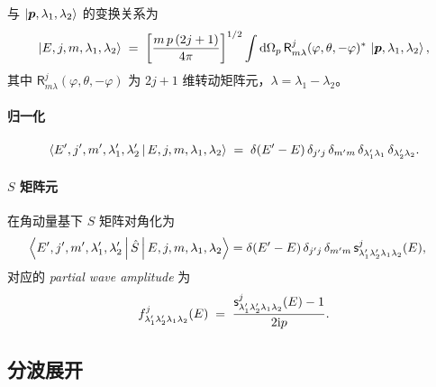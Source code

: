 与 $\ket{\bm p,\lambda_1,\lambda_2}$ 的变换关系为
\begin{equation}
  \ket{E,j,m,\lambda_1,\lambda_2}
  \;=\; \left[\frac{m\,p\,(2j+1)}{4\pi}\right]^{1/2}
        \int \mathrm{d}\Omega_p\, \mathsf{R}^{j}_{m\lambda}(\varphi,\theta,-\varphi)^*\,\ket{\bm p,\lambda_1,\lambda_2},
  \label{eq:Ejm-from-p}
\end{equation}
其中 $\mathsf{R}^{j}_{m\lambda}(\varphi,\theta,-\varphi)$ 为 $2j+1$ 维转动矩阵元，$\lambda=\lambda_1-\lambda_2$。

\paragraph{归一化}
\begin{equation}
  \left\langle E',j',m',\lambda'_1,\lambda'_2 \,\middle|\, E,j,m,\lambda_1,\lambda_2 \right\rangle
  \;=\; \delta(E'-E)\,\delta_{j'j}\,\delta_{m'm}\,\delta_{\lambda'_1\lambda_1}\,\delta_{\lambda'_2\lambda_2}.
  \label{eq:Ejm-norm}
\end{equation}

\paragraph{$S$ 矩阵元} 在角动量基下 $S$ 矩阵对角化为
\begin{align}
  \left\langle E',j',m',\lambda'_1,\lambda'_2 \,\middle|\, \hat{S} \,\middle|\, E,j,m,\lambda_1,\lambda_2 \right\rangle
  &= \delta(E'-E)\,\delta_{j'j}\,\delta_{m'm}\,\mathsf{s}^{j}_{\lambda'_1\lambda'_2\lambda_1\lambda_2}(E),
  \label{eq:Smat-Ejm}
\end{align}
对应的 \emph{partial wave amplitude} 为
\begin{equation}
  f^{j}_{\lambda'_1\lambda'_2\lambda_1\lambda_2}(E)
  \;=\; \frac{\mathsf{s}^{j}_{\lambda'_1\lambda'_2\lambda_1\lambda_2}(E) - 1}{2\mathrm{i} p}.
  \label{eq:fj-def}
\end{equation}

\subsection{分波展开}

